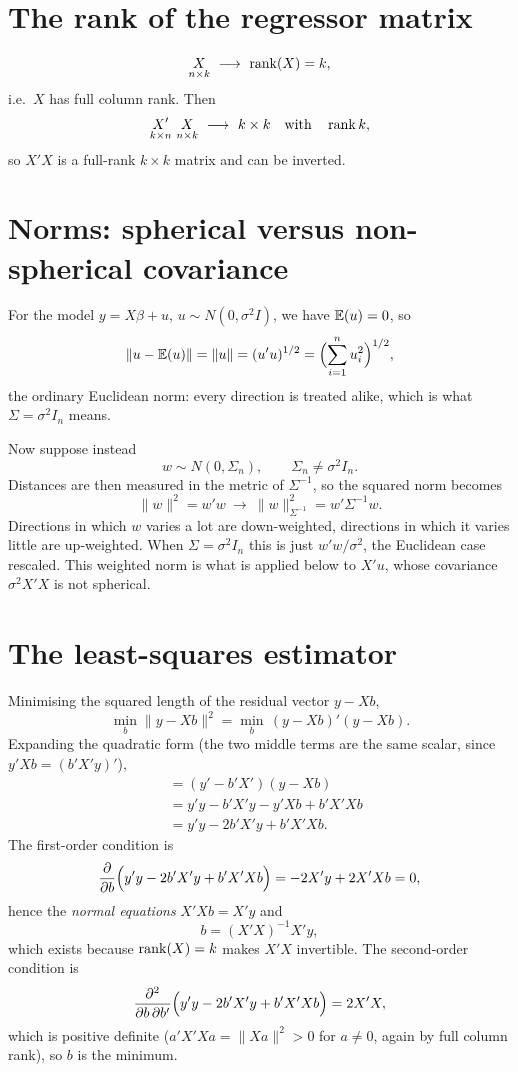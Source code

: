 \documentclass[11pt]{article}
\begin{document}
\section{The rank of the regressor matrix}

\[ \underset{n\times k}{X}\ \longrightarrow\ \rank(X)=k, \]
i.e.\ $X$ has full column rank. Then
\[ \underset{k\times n}{X'}\ \underset{n\times k}{X}\ \longrightarrow\ k\times k
   \quad\text{with}\quad \operatorname{rank} k, \]
so $X'X$ is a full-rank $k\times k$ matrix and can be inverted.

\section{Norms: spherical versus non-spherical covariance}

For the model $y=X\beta+u$, $u\sim N(0,\sigma^2I)$, we have $\mathbb{E}(u)=0$, so
\[ \|u-\mathbb{E}(u)\|=\|u\|=(u'u)^{1/2}=\Bigl(\sum_{i=1}^{n}u_i^2\Bigr)^{1/2}, \]
the ordinary Euclidean norm: every direction is treated alike, which is what
$\Sigma=\sigma^2I_n$ means.

Now suppose instead
\[ w\sim N(0,\Sigma_n),\qquad \Sigma_n\ne \sigma^2I_n . \]
Distances are then measured in the metric of $\Sigma^{-1}$, so the squared norm
becomes
\[ \|w\|^2=w'w\ \longrightarrow\ \|w\|^2_{\Sigma^{-1}}=w'\Sigma^{-1}w . \]
Directions in which $w$ varies a lot are down-weighted, directions in which it
varies little are up-weighted. When $\Sigma=\sigma^2I_n$ this is just
$w'w/\sigma^2$, the Euclidean case rescaled. This weighted norm is what is applied
below to $X'u$, whose covariance $\sigma^2X'X$ is not spherical.

\section{The least-squares estimator}

Minimising the squared length of the residual vector $y-Xb$,
\[ \min_b\|y-Xb\|^2=\min_b\,(y-Xb)'(y-Xb) . \]
Expanding the quadratic form (the two middle terms are the same scalar, since
$y'Xb=(b'X'y)'$),
\[
\begin{aligned}
  &= (y'-b'X')(y-Xb)\\
  &= y'y-b'X'y-y'Xb+b'X'Xb\\
  &= y'y-2b'X'y+b'X'Xb .
\end{aligned}
\]
The first-order condition is
\[ \frac{\partial}{\partial b}\Bigl(y'y-2b'X'y+b'X'Xb\Bigr)=-2X'y+2X'Xb=0, \]
hence the \emph{normal equations} $X'Xb=X'y$ and
\[ b=(X'X)^{-1}X'y , \]
which exists because $\operatorname{rank}(X)=k$ makes $X'X$ invertible. The second-order
condition is
\[ \frac{\partial^2}{\partial b\,\partial b'}\Bigl(y'y-2b'X'y+b'X'Xb\Bigr)=2X'X , \]
which is positive definite ($a'X'Xa=\|Xa\|^2>0$ for $a\ne0$, again by full column
rank), so $b$ is the minimum.
\end{document}

